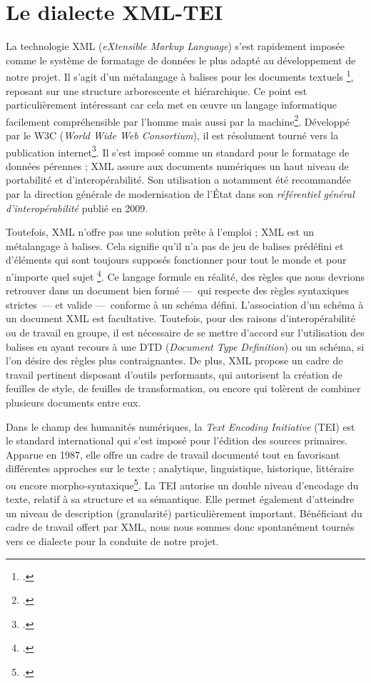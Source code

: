 \documentclass[12pt,a4paper]{book} %
\begin{document}
\section{Le dialecte XML-TEI}
La technologie XML (\textit{eXtensible Markup Language}) s'est rapidement imposée comme le système de formatage de données le plus adapté au développement de notre projet. Il s'agit d'un \og métalangage à balises pour les documents textuels \fg{}\footcite[p.~3]{harold_xml_2005}, reposant sur une structure arborescente et hiérarchique. Ce point est particulièrement intéressant car cela met en œuvre un langage informatique facilement compréhensible par l'homme mais aussi par la machine\footcite[p.~97]{harold_xml_2005}. Développé par le W3C (\textit{World Wide Web Consortium}), il est résolument tourné vers la publication internet\footcite{burghart_edition_2011}. Il s'est imposé comme un standard pour le formatage de données pérennes ; XML assure aux documents numériques un haut niveau de portabilité et d'interopérabilité. Son utilisation a notamment été recommandée par la direction générale de modernisation de l'État dans son \textit{référentiel général d'interopérabilité} publié en 2009.%

Toutefois, XML n'offre pas une solution prête à l'emploi ; \og XML est un métalangage à balises. Cela signifie qu'il n'a pas de jeu de balises prédéfini et d'éléments qui sont toujours supposés fonctionner pour tout le monde et pour n'importe quel sujet \fg{}\footcite[p.~4]{harold_xml_2005}. Ce langage formule en réalité, des règles que nous devrions retrouver dans un document bien formé ---~qui respecte des règles syntaxiques strictes~--- et valide ---~conforme à un schéma défini. L'association d'un schéma à un document XML est facultative. Toutefois, pour des raisons d'interopérabilité ou de travail en groupe, il est nécessaire de se mettre d'accord sur l'utilisation des balises en ayant recours à une DTD (\textit{Document Type Definition}) ou un schéma, si l'on désire des règles plus contraignantes. De plus, XML propose un cadre de travail pertinent disposant d'outils performants, qui autorisent la création de feuilles de style, de feuilles de transformation, ou encore qui tolèrent de combiner plusieurs documents entre eux.

Dans le champ des humanités numériques, la \textit{Text Encoding Initiative} (TEI) est le standard international qui s'est imposé pour l'édition des sources primaires. Apparue en 1987, elle offre un cadre de travail documenté tout en favorisant différentes approches sur le texte ; analytique, linguistique, historique, littéraire ou encore morpho-syntaxique\footcite{burghart_edition_2011}. La TEI autorise un double niveau d'encodage du texte, relatif à sa structure et sa sémantique. Elle permet également d'atteindre un niveau de description (granularité) particulièrement important. Bénéficiant du cadre de travail offert par XML, nous nous sommes donc spontanément tournés vers ce dialecte pour la conduite de notre projet.
\end{document}
